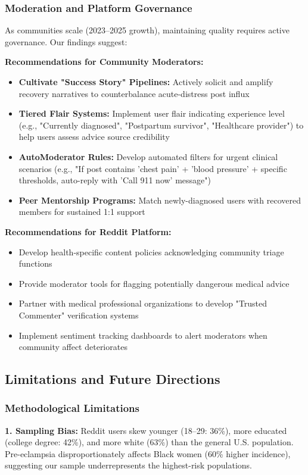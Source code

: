 \documentclass[12pt, a4paper]{article}
\begin{document}
\subsubsection{Moderation and Platform Governance}
As communities scale (2023--2025 growth), maintaining quality requires active governance. Our findings suggest:

\textbf{Recommendations for Community Moderators:}
\begin{itemize}
    \item \textbf{Cultivate "Success Story" Pipelines:} Actively solicit and amplify recovery narratives to counterbalance acute-distress post influx
    \item \textbf{Tiered Flair Systems:} Implement user flair indicating experience level (e.g., "Currently diagnosed", "Postpartum survivor", "Healthcare provider") to help users assess advice source credibility
    \item \textbf{AutoModerator Rules:} Develop automated filters for urgent clinical scenarios (e.g., "If post contains 'chest pain' + 'blood pressure' + specific thresholds, auto-reply with 'Call 911 now' message")
    \item \textbf{Peer Mentorship Programs:} Match newly-diagnosed users with recovered members for sustained 1:1 support
\end{itemize}

\textbf{Recommendations for Reddit Platform:}
\begin{itemize}
    \item Develop health-specific content policies acknowledging community triage functions
    \item Provide moderator tools for flagging potentially dangerous medical advice
    \item Partner with medical professional organizations to develop "Trusted Commenter" verification systems
    \item Implement sentiment tracking dashboards to alert moderators when community affect deteriorates
\end{itemize}

\subsection{Limitations and Future Directions}

\subsubsection{Methodological Limitations}
\textbf{1. Sampling Bias:} Reddit users skew younger (18--29: 36\%), more educated (college degree: 42\%), and more white (63\%) than the general U.S. population. Pre-eclampsia disproportionately affects Black women (60\% higher incidence), suggesting our sample underrepresents the highest-risk populations.
\end{document}
